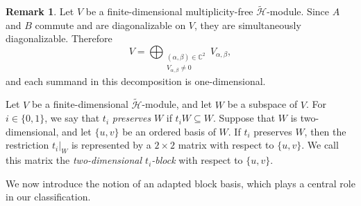 \documentclass[reqno]{amsart}
\theoremstyle{definition}
\newtheorem{remark}[theorem]{Remark}
\begin{document}
\begin{remark}\label{rmk:ds}
Let $V$ be a finite-dimensional multiplicity-free 
$\widetilde{\mathcal H}$-module.
Since $A$ and $B$ commute and are diagonalizable on $V$,
they are simultaneously diagonalizable.
Therefore
$$
V=\bigoplus_{\substack{(\alpha,\beta)\in\mathbb C^2\\
V_{\alpha,\beta}\neq 0}}
V_{\alpha,\beta},
$$
and each summand in this decomposition is one-dimensional.
\end{remark}

Let $V$ be a finite-dimensional $\widetilde{\mathcal H}$-module, and let
$W$ be a subspace of $V$.
For $i\in\{0,1\}$, we say that $t_i$ {\it preserves} $W$ if
$t_iW\subseteq W$.
Suppose that $W$ is two-dimensional, and let $\{u,v\}$ be an ordered basis of $W$.
If $t_i$ preserves $W$, then the restriction $t_i|_W$ is represented by a
$2\times2$ matrix with respect to $\{u,v\}$.
We call this matrix the {\it two-dimensional $t_i$-block} with respect to $\{u,v\}$.

We now introduce the notion of an adapted block basis, which plays a central role in our classification.
\end{document}
